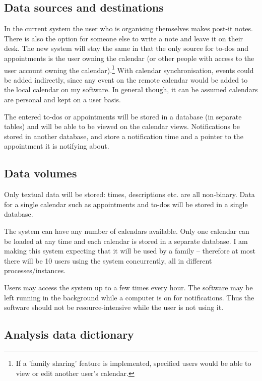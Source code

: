 \subsection{Data sources and destinations}

In the current system the user who is organising themselves makes post-it notes.
There is also the option for someone else to write a note and leave it on their
desk. The new system will stay the same in that the only source for to-dos and
appointments is the user owning the calendar (or other people with access to the
user account owning the calendar).\footnote{If a 'family sharing' feature is
implemented, specified users would be able to view or edit another user's
calendar.} With calendar synchronisation, events could be added indirectly,
since any event on the remote calendar would be added to the local calendar on
my software. In general though, it can be assumed calendars are personal and
kept on a user basis.

The entered to-dos or appointments will be stored in a database (in separate
tables) and will be able to be viewed on the calendar views. Notifications be
stored in another database, and store a notification time and a pointer to the
appointment it is notifying about.


\subsection{Data volumes}

Only textual data will be stored: times, descriptions etc. are all
non-binary. Data for a single calendar such as appointments and to-dos will be
stored in a single database.

The system can have any number of calendars available. Only one calendar can be
loaded at any time and each calendar is stored in a separate database. I am
making this system expecting that it will be used by a family -- therefore at
most there will be 10 users using the system concurrently, all in different
processes/instances.

Users may access the system up to a few times every hour. The software may be
left running in the background while a computer is on for notifications. Thus
the software should not be resource-intensive while the user is not using it.


\subsection{Analysis data dictionary}

